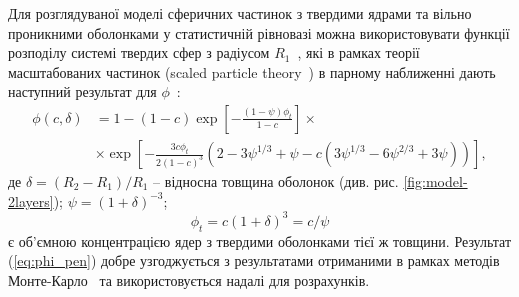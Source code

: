 \documentclass[14pt,twoside]{vakthesis}
\begin{document}
Для розглядуваної моделі сферичних частинок з твердими ядрами та вільно проникними оболонками у статистичній рівновазі можна використовувати  функції розподілу системі твердих сфер з радіусом $R_1$~\cite{Wertheim1963, Lebowitz1964}, які в рамках теорії масштабованих частинок (scaled particle theory~\cite{Reiss1959}) в парному наближенні дають наступний результат для $\phi$~\cite{RikvoldP.1985}: 
\begin{equation}\label{eq:phi_pen}
\begin{split}
\phi(c,\delta) &= 1 - (1-c)\exp{\left[ -\frac{(1-\psi)\phi_t}{1-c} \right]} \times \\
&\times\exp{\left[ -\frac{3c\phi_t}{2(1-c)^3} \left( 2 - 3
	\psi^{1/3} + \psi - c \left( 3\psi^{1/3} - 6\psi^{2/3} +3\psi
	\right) \right) \right]},
\end{split}
\end{equation}
де $\delta = (R_2 - R_1)/R_1$ -- відносна товщина оболонок (див. рис. \ref{fig:model-2layers}); $\psi=(1+\delta)^{-3}$; 
\begin{equation}\label{eq:phi-hard}
\phi_t = c (1+\delta)^3 = c/\psi
\end{equation}
є об'ємною концентрацією ядер з твердими оболонками тієї ж товщини.
Результат (\ref{eq:phi_pen}) добре узгоджується з результатами отриманими в рамках методів Монте-Карло~\cite{Rotter2003} та використовується надалі для розрахунків.
\end{document}

